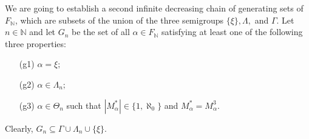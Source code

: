 \documentclass[11pt]{article}
\theoremstyle{plain}
\theoremstyle{definition}
\begin{document}
We are going to establish a second infinite decreasing chain of generating sets of $F_{\mathbb{N}}$, which are subsets of the union of the three semigroups $\{\xi\},\Lambda,$ and $\Gamma.$ Let $n\in\mathbb{N}$ and let $G_{n}$ be the set of all $\alpha\in F_{\mathbb{N}}$ satisfying at least one of the following three properties:
\begin{itemize}
\item[(g1)] $\alpha=\xi;$
\item[(g2)] $\alpha\in \Lambda_{n};$
\item[(g3)] $\alpha\in\Theta_{n}$ such that $\left\vert M_{\alpha}^{*}\right\vert\in\{1,\aleph_{0}\}$ and $M_{\alpha}^{*}=M_{\alpha}^{3}.$ %
\end{itemize}
Clearly, $G_{n}\subseteq \Gamma\cup\Lambda_{n}\cup\{\xi\}.$
\end{document}
